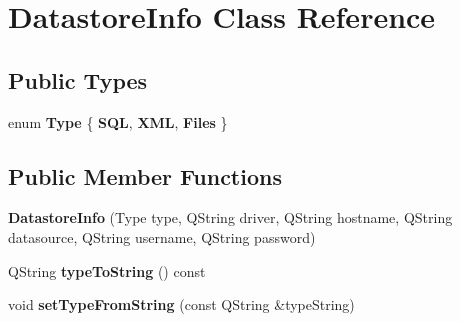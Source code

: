 \hypertarget{class_datastore_info}{}\section{Datastore\+Info Class Reference}
\label{class_datastore_info}
\subsection*{Public Types}
\begin{DoxyCompactItemize}
\item 
\mbox{\label{class_datastore_info_afdd306a952b938f923c0a6f0207d57d1}} 
enum {\bfseries Type} \{ {\bfseries S\+QL}, 
{\bfseries X\+ML}, 
{\bfseries Files}
 \}
\end{DoxyCompactItemize}
\subsection*{Public Member Functions}
\begin{DoxyCompactItemize}
\item 
\mbox{\label{class_datastore_info_aec3d52f4752cf57c4d7968d8e49b92f9}} 
{\bfseries Datastore\+Info} (Type type, Q\+String driver, Q\+String hostname, Q\+String datasource, Q\+String username, Q\+String password)
\item 
\mbox{\label{class_datastore_info_a3ff5a103df525b8b87b3a52212205d34}} 
Q\+String {\bfseries type\+To\+String} () const
\item 
\mbox{\label{class_datastore_info_a8f39ec90621ad095f0ff14eab1de7352}} 
void {\bfseries set\+Type\+From\+String} (const Q\+String \&type\+String)
\end{DoxyCompactItemize}
